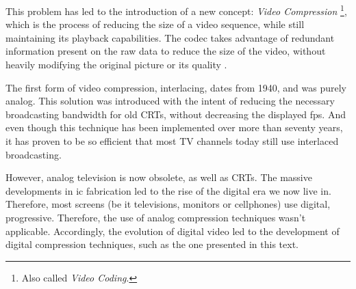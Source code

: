
This problem has led to the introduction of a new concept: \textit{Video Compression} \footnote{Also called \textit{Video Coding}.}, which is the process of reducing the size of a video sequence, while still maintaining its playback capabilities. The \Gls{codec} takes advantage of redundant information present on the raw data to reduce the size of the video, without heavily modifying the original picture or its quality
. 

The first form of video compression, \gls{interlacing}, dates from 1940, and was purely analog. This solution was introduced with the intent of reducing the necessary broadcasting bandwidth for old \glspl{CRT}, without decreasing the displayed fps. And even though this technique has been implemented over more than seventy years, it has proven to be so efficient that most TV channels today still use interlaced broadcasting.

However, analog television is now obsolete, as well as CRTs. The massive developments in \Gls{ic} fabrication led to the rise of the digital era we now live in. Therefore, most screens (be it televisions, monitors or cellphones) use digital, \gls{progressive}. Therefore, the use of analog compression techniques wasn't applicable. Accordingly, the evolution of digital video led to the development of digital compression techniques, such as the one presented in this text.


\printbibliography[heading=subbibliography]
